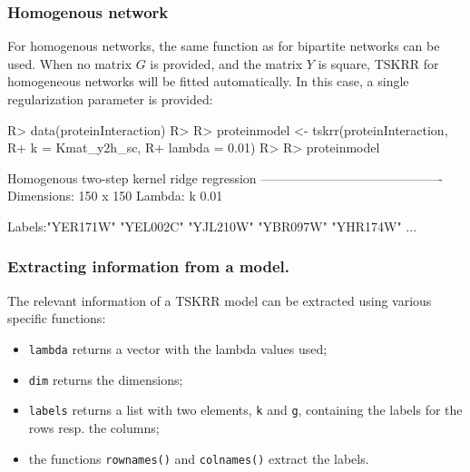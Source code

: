 \documentclass[
]{article}
\providecommand{\tightlist}{%
  \setlength{\itemsep}{0pt}\setlength{\parskip}{0pt}}
\begin{document}
\hypertarget{homogenous-network}{%
\subsubsection{Homogenous network}\label{homogenous-network}}

For homogenous networks, the same function as for bipartite networks can
be used. When no matrix \(G\) is provided, and the matrix \(Y\) is
square, TSKRR for homogeneous networks will be fitted automatically. In
this case, a single regularization parameter is provided:

\begin{CodeChunk}

\begin{CodeInput}
R> data(proteinInteraction)
R> 
R> proteinmodel <- tskrr(proteinInteraction,
R+                       k = Kmat_y2h_sc,
R+                       lambda = 0.01)
R> 
R> proteinmodel
\end{CodeInput}

\begin{CodeOutput}
Homogenous two-step kernel ridge regression
-------------------------------------------
Dimensions: 150 x 150 
Lambda:
   k 
0.01 

Labels:"YER171W" "YEL002C" "YJL210W" "YBR097W" "YHR174W" ...
\end{CodeOutput}
\end{CodeChunk}

\hypertarget{extracting-information-from-a-model.}{%
\subsubsection{Extracting information from a
model.}\label{extracting-information-from-a-model.}}

The relevant information of a TSKRR model can be extracted using various
specific functions:

\begin{itemize}
\tightlist
\item
  \texttt{lambda} returns a vector with the lambda values used;
\item
  \texttt{dim} returns the dimensions;
\item
  \texttt{labels} returns a list with two elements, \texttt{k} and
  \texttt{g}, containing the labels for the rows resp. the columns;
\item
  the functions \texttt{rownames()} and \texttt{colnames()} extract the
  labels.
\end{itemize}
\end{document}
